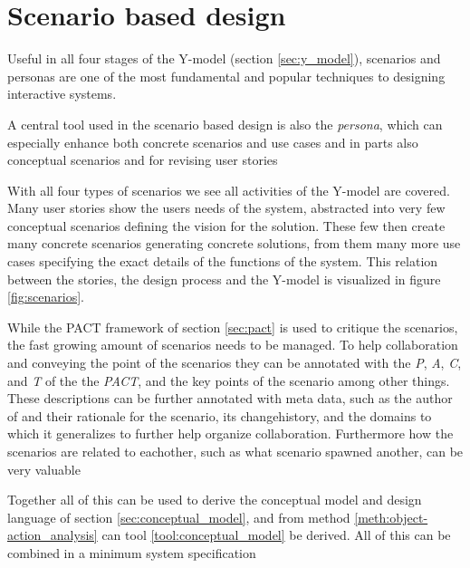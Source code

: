 \section{Scenario based design} \label{sec:scenario_based_design}
Useful in all four stages of the Y-model (section \ref{sec:y_model}), scenarios and personas are one of the most fundamental and popular techniques to designing interactive systems. \cite[p. 62]{benyon14}






A central tool used in the scenario based design is also the \emph{persona}, which can especially enhance both concrete scenarios and use cases and in parts also conceptual scenarios and for revising user stories



With all four types of scenarios we see all activities of the Y-model are covered. Many user stories show the users needs of the system, abstracted into very few conceptual scenarios defining the vision for the solution. These few then create many concrete scenarios generating concrete solutions, from them many more use cases specifying the exact details of the functions of the system. This relation between the stories, the design process and the Y-model is visualized in figure \ref{fig:scenarios}. \cite[p. 66, 196]{benyon14}





While the PACT framework of section \ref{sec:pact} is used to critique the scenarios, the fast growing amount of scenarios needs to be managed. To help collaboration and conveying the point of the scenarios they can be annotated with the \emph{P}, \emph{A}, \emph{C}, and \emph{T} of the the \emph{PACT}, and the key points of the scenario among other things. These descriptions can be further annotated with meta data, such as the author of and their rationale for the scenario, its changehistory, and the domains to which it generalizes to further help organize collaboration. Furthermore how the scenarios are related to eachother, such as what scenario spawned another, can be very valuable \cite[p. 70,72]{benyon14}






Together all of this can be used to derive the conceptual model and design language of section \ref{sec:conceptual_model}, and from method \ref{meth:object-action_analysis} can tool \ref{tool:conceptual_model} be derived. \cite[p. 67]{benyon14} All of this can be combined in a minimum system specification


